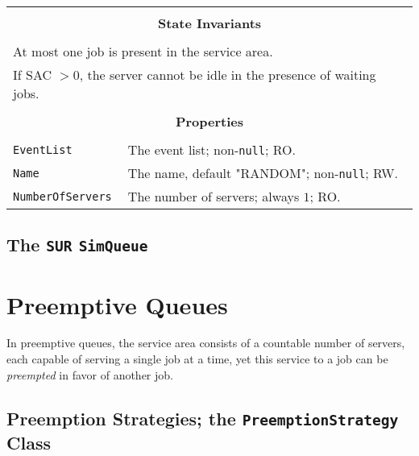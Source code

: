 \documentclass[12pt]{book}
\begin{document}
\begin{tabular}{|l|l|l|}
\hline
\multicolumn{3}{|c|}{} \\
\multicolumn{3}{|c|}{\bf State  Invariants} \\
\multicolumn{3}{|c|}{} \\
\hline
\multicolumn{3}{|l|}{At most one job is present in the service area.} \\
\multicolumn{3}{|l|}{If SAC $> 0$, the server cannot be idle in the presence of waiting jobs.} \\
\hline
\multicolumn{3}{|c|}{} \\
\multicolumn{3}{|c|}{\bf Properties} \\
\multicolumn{3}{|c|}{} \\
\hline
\lstinline|EventList|       & \multicolumn{2}{|l|}{The event list; non-\lstinline|null|; RO.} \\
\hline
\lstinline|Name|            & \multicolumn{2}{|l|}{The name, default "RANDOM"; non-\lstinline|null|; RW.} \\
\hline
\lstinline|NumberOfServers| & \multicolumn{2}{|l|}{The number of servers; always $1$; RO.} \\
\hline
\end{tabular}

\subsection{The \lstinline{SUR} \lstinline{SimQueue}}

\section{Preemptive Queues}

In preemptive queues,
  the service area consists of a countable number of servers,
  each capable of serving a single job at a time,
  yet this service to a job can be {\em preempted\/} in favor of another job.

\subsection{Preemption Strategies; the \lstinline{PreemptionStrategy} Class}
\end{document}
